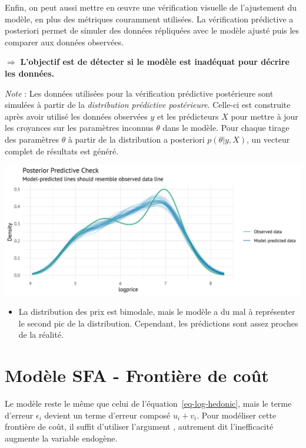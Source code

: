 \documentclass[
  12pt,
]{report}
\providecommand{\tightlist}{%
  \setlength{\itemsep}{0pt}\setlength{\parskip}{0pt}}\usepackage{longtable,booktabs,array}
\renewcommand{\texttt}[1]{\colorbox{light}{\color{highlight}{\ttfamily{#1}}}}
\begin{document}
\newpage

Enfin, on peut aussi mettre en œuvre une vérification visuelle de
l'ajustement du modèle, en plus des métriques couramment utilisées. La
vérification prédictive a posteriori permet de simuler des données
répliquées avec le modèle ajusté puis les comparer aux données
observées.

\(\Rightarrow\) \textbf{L'objectif est de détecter si le modèle est
inadéquat pour décrire les données.}

\emph{Note} : Les données utilisées pour la vérification prédictive
postérieure sont simulées à partir de la \emph{distribution prédictive
postérieure}. Celle-ci est construite après avoir utilisé les données
observées \(y\) et les prédicteurs \(X\) pour mettre à jour les
croyances sur les paramètres inconnus \(\theta\) dans le modèle. Pour
chaque tirage des paramètres \(\theta\) à partir de la distribution a
posteriori \(p(\theta|y,X)\), un vecteur complet de résultats est
généré.

\begin{center}
\includegraphics{report_files/figure-pdf/posterior-1.pdf}
\end{center}

\begin{itemize}
\tightlist
\item
  La distribution des prix est bimodale, mais le modèle a du mal à
  représenter le second pic de la distribution. Cependant, les
  prédictions sont assez proches de la réalité.
\end{itemize}

\section{Modèle SFA - Frontière de
coût}\label{moduxe8le-sfa---frontiuxe8re-de-couxfbt}

Le modèle reste le même que celui de l'équation~\ref{eq-log-hedonic},
mais le terme d'erreur \(\epsilon_i\) devient un terme d'erreur composé
\(u_i + v_i\). Pour modéliser cette frontière de coût, il suffit
d'utiliser l'argument \texttt{ineffDecrease\ =\ FALSE}, autrement dit
l'inefficacité augmente la variable endogène.
\end{document}
